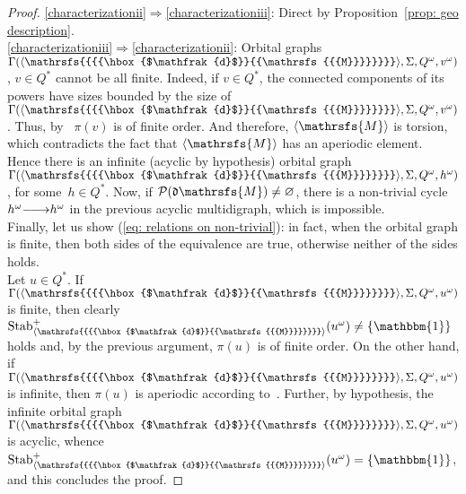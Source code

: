 \documentclass{amsart}
\begin{document}
\begin{proof}
\ref{characterizationii}$\Rightarrow$\ref{characterizationiii}: Direct by Proposition~\ref{prop: geo description}.\\
\ref{characterizationiii}$\Rightarrow$\ref{characterizationii}: Orbital graphs $\Gamma({{{{\langle}{{\mathrsfs{{{{\hbox{$\mathfrak{d}$}}{{\mathrsfs{{{M}}}}}}}}}}{\rangle}}}},{{{\Sigma}}}, {{{Q}}}^{\omega},v^{\omega})$, $v\in {{{Q}}}^{*}$ cannot be all finite. Indeed, if $v \in {{{Q}}}^*$,  the connected components of its powers have sizes bounded by the size of $\Gamma({{{{\langle}{{\mathrsfs{{{{\hbox{$\mathfrak{d}$}}{{\mathrsfs{{{M}}}}}}}}}}{\rangle}}}},{{{\Sigma}}}, {{{Q}}}^{\omega},v^{\omega})$.   Thus, by~\cite[Proposition~7]{KiPiSa15a} $\pi(v)$ is of finite order. And therefore, ${{{\langle}{{\mathrsfs{{{M}}}}}{\rangle}}}$ is torsion, which contradicts the fact that ${{{\langle}{{\mathrsfs{{{M}}}}}{\rangle}}}$ has an aperiodic element. Hence there is an infinite (acyclic by hypothesis) orbital graph $\Gamma({{{{\langle}{{\mathrsfs{{{{\hbox{$\mathfrak{d}$}}{{\mathrsfs{{{M}}}}}}}}}}{\rangle}}}},{{{\Sigma}}}, {{{Q}}}^{\omega},h^{\omega})$, for some~$h\in {{{Q}}}^{*}$. Now, if $\mathcal{P}({\hbox{$\mathfrak{d}$}}{{{\mathrsfs{{M}}}}}) \neq\varnothing$, there is a non-trivial cycle $h^{\omega}{\smash{\stackrel{\text{\tiny{${}$}}}{\relbar\joinrel\longrightarrow}}} h^{\omega}$ in the previous acyclic multidigraph, which is impossible.\\
Finally, let us show (\ref{eq: relations on non-trivial}): in fact, when the orbital graph is finite, then both sides of the equivalence are true, otherwise neither of the sides holds.\\
Let $u\in {{{Q}}}^{*}$. If $\Gamma({{{{\langle}{{\mathrsfs{{{{\hbox{$\mathfrak{d}$}}{{\mathrsfs{{{M}}}}}}}}}}{\rangle}}}},{{{\Sigma}}}, {{{Q}}}^{\omega},u^{\omega})$ is finite, then clearly $\operatorname{Stab}_{{{{\langle}{{\mathrsfs{{{{\hbox{$\mathfrak{d}$}}{{\mathrsfs{{{M}}}}}}}}}}{\rangle}}}}^{+}(u^{\omega})\neq \{\operatorname{\mathbbm{1}}\}$ holds and, by the previous argument, $\pi(u)$ is of finite order. On the other hand, if $\Gamma({{{{\langle}{{\mathrsfs{{{{\hbox{$\mathfrak{d}$}}{{\mathrsfs{{{M}}}}}}}}}}{\rangle}}}},{{{\Sigma}}}, {{{Q}}}^{\omega},u^{\omega})$ is infinite, then $\pi(u)$ is aperiodic according to~\cite[Proposition~7]{KiPiSa15a}. Further, by hypothesis, the infinite orbital graph $\Gamma({{{{\langle}{{\mathrsfs{{{{\hbox{$\mathfrak{d}$}}{{\mathrsfs{{{M}}}}}}}}}}{\rangle}}}},{{{\Sigma}}}, {{{Q}}}^{\omega},u^{\omega})$ is acyclic, whence $\operatorname{Stab}_{{{{\langle}{{\mathrsfs{{{{\hbox{$\mathfrak{d}$}}{{\mathrsfs{{{M}}}}}}}}}}{\rangle}}}}^{+}(u^{\omega})=\{\operatorname{\mathbbm{1}}\}$, and this concludes the proof.
\end{proof}
\end{document}
